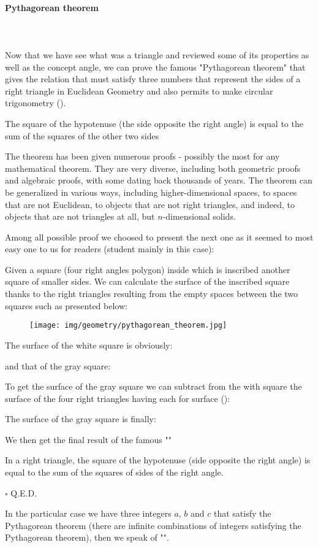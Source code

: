 	\pagebreak
	\paragraph{Pythagorean theorem}\mbox{}\\\\
	Now that we have see what was a triangle and reviewed some of its properties as well as the concept angle, we can prove the famous "Pythagorean theorem" that gives the relation that must satisfy three numbers that represent the sides of a right triangle in Euclidean Geometry and also permits to make circular trigonometry ().
	
	\begin{theorem}
	The square of the hypotenuse (the side opposite the right angle) is equal to the sum of the squares of the other two sides
	\end{theorem}
	The theorem has been given numerous proofs - possibly the most for any mathematical theorem. They are very diverse, including both geometric proofs and algebraic proofs, with some dating back thousands of years. The theorem can be generalized in various ways, including higher-dimensional spaces, to spaces that are not Euclidean, to objects that are not right triangles, and indeed, to objects that are not triangles at all, but $n$-dimensional solids.
	
	Among all possible proof we choosed to present the next one as it seemed to most easy one to us for readers (student mainly in this case):
	\begin{dem}
	Given a square (four right angles polygon) inside which is inscribed another square of smaller sides. We can calculate the surface of the inscribed square thanks to the right triangles resulting from the empty spaces between the two squares such as presented below:
	\begin{figure}[H]
		\centering
		\texttt{[image: img/geometry/pythagorean\_theorem.jpg]}
	\end{figure}
	The surface of the white square is obviously:
	
	and that of the gray square:
	
	To get the surface of the gray square we can subtract from the with square the surface of the four right triangles having each for surface ():
	
	The surface of the gray square is finally:
	
	We then get the final result of the famous ""
	
	In a right triangle, the square of the hypotenuse (side opposite the right angle) is equal to the sum of the squares of sides of the right angle.
	\begin{flushright}
		$\square$  Q.E.D.
	\end{flushright}
	\end{dem}
	In the particular case we have three integers $a$, $b$ and $c$ that satisfy the Pythagorean theorem (there are infinite combinations of integers satisfying the Pythagorean theorem), then we speak of "".
	
